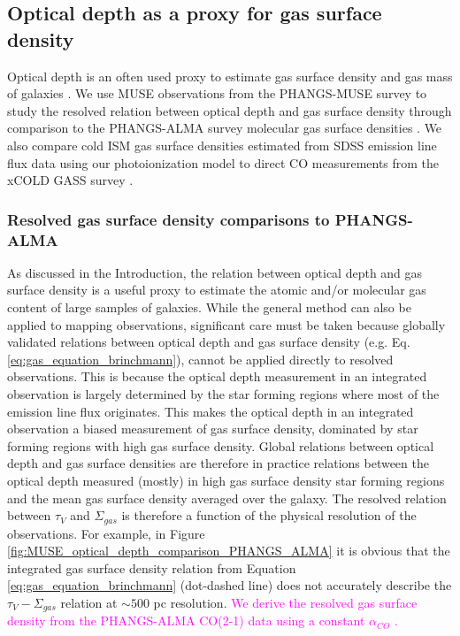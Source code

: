\documentclass[fleqn,usenatbib]{mnras}
\begin{document}
\subsection{Optical depth as a proxy for gas surface density}
\label{sec:gas_surface_density}
Optical depth is an often used proxy to estimate gas surface density and gas mass of galaxies \citep[e.g.][]{guver2009, heiderman2010, brinchmann2013, concas2019}. We use MUSE observations from the PHANGS-MUSE survey \citep{emsellem2021} to study the resolved relation between optical depth and gas surface density through comparison to the PHANGS-ALMA survey molecular gas surface densities \citep{leroy2021}. We also compare cold ISM gas surface densities estimated from SDSS emission line flux data using our photoionization model to direct CO measurements from the xCOLD GASS survey \citep{saintonge2017}.

\subsubsection{Resolved gas surface density comparisons to PHANGS-ALMA}
As discussed in the Introduction, the relation between optical depth and gas surface density is a useful proxy to estimate the atomic and/or molecular gas content of large samples of galaxies. While the general method can also be applied to mapping  observations, significant care must be taken because globally validated relations between optical depth and gas surface density (e.g.  Eq. \ref{eq:gas_equation_brinchmann}), cannot be applied directly to resolved observations. This is because the optical depth measurement in an integrated observation is largely determined by the star forming regions where most of the emission line flux originates. This makes the optical depth in an integrated observation a biased measurement of gas surface density, dominated by star forming regions with high gas surface density. Global relations between optical depth and gas surface densities are therefore in practice relations between the optical depth measured (mostly) in high gas surface density star forming regions and the mean gas surface density averaged over the galaxy. The resolved relation between $\tau_V$ and $\Sigma_{gas}$ is therefore a function of the physical resolution of the observations. For example, in Figure \ref{fig:MUSE_optical_depth_comparison_PHANGS_ALMA} it is obvious that the integrated gas surface density relation from Equation \ref{eq:gas_equation_brinchmann} (dot-dashed line) does not accurately describe the $\tau_V-\Sigma_{gas}$ relation at $\sim500$ pc resolution. \textcolor{magenta}{We derive the resolved gas surface density from the PHANGS-ALMA CO(2-1) data using a constant $\alpha_{CO}$ \citep[][]{leroy2021}.}
\end{document}

